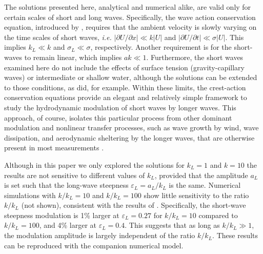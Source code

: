 \documentclass[lineno]{jfm}
\begin{document}
The solutions presented here, analytical and numerical alike, are valid only
for certain scales of short and long waves.
Specifically, the wave action conservation equation, introduced by
\citet{bretherton1968wavetrains}, requires that the ambient velocity is slowly
varying on the time scales of short waves, \textit{i.e.}
$|\partial U / \partial x| \ll k |U|$
and $|\partial U / \partial t| \ll \sigma |U|$.
This implies $k_L \ll k$ and $\sigma_L \ll \sigma$, respectively.
Another requirement is for the short-waves to remain linear, which implies
$a k \ll 1$.
Furthermore, the short waves examined here do not include the effects of
surface tension (gravity-capillary waves) or intermediate or shallow water,
although the solutions can be extended to those conditions, as
\citet{phillips1981dispersion} did, for example.
Within these limits, the crest-action conservation equations provide an
elegant and relatively simple framework to study the hydrodynamic modulation
of short waves by longer waves.
This approach, of course, isolates this particular process from other
dominant modulation and nonlinear transfer processes, such as wave growth
by wind, wave dissipation, and aerodynamic sheltering by the longer waves,
that are otherwise present in most measurements
\citep{plant1986two,laxague2017gravity}. 

Although in this paper we only explored the solutions for $k_L = 1$ and $k=10$
the results are not sensitive to different values of $k_L$, provided that the
amplitude $a_L$ is set such that the long-wave steepness $\varepsilon_L = a_L / k_L$
is the same.
Numerical simulations with $k/k_L = 10$ and $k/k_L = 100$ show little
sensitivity to the ratio $k/k_L$ (not shown), consistent with the results of
\citet{longuet1987propagation}.
Specifically, the short-wave steepness modulation is 1\% larger at
$\varepsilon_L = 0.27$ for $k/k_L = 10$ compared to $k/k_L = 100$, and 4\%
larger at $\varepsilon_L = 0.4$.
This suggests that as long as $k/k_L \gg 1$, the modulation amplitude is
largely independent of the ratio $k/k_L$.
These results can be reproduced with the companion numerical model.
\end{document}
